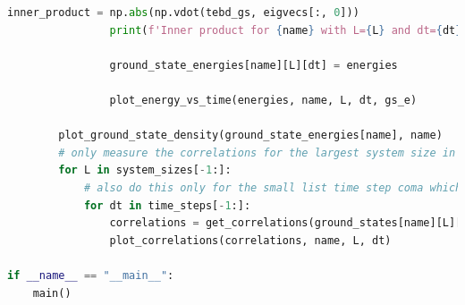 \documentclass[12pt]{article}
\begin{document}
\begin{lstlisting}[language=Python]
                inner_product = np.abs(np.vdot(tebd_gs, eigvecs[:, 0]))
                print(f'Inner product for {name} with L={L} and dt={dt} is {inner_product}')
                
                ground_state_energies[name][L][dt] = energies
                
                plot_energy_vs_time(energies, name, L, dt, gs_e)
        
        plot_ground_state_density(ground_state_energies[name], name)
        # only measure the correlations for the largest system size in the list
        for L in system_sizes[-1:]:
            # also do this only for the small list time step coma which is at the end of the list
            for dt in time_steps[-1:]:
                correlations = get_correlations(ground_states[name][L][dt])
                plot_correlations(correlations, name, L, dt)

if __name__ == "__main__":
    main()
 

    

        
    
    

        
    
    
\end{lstlisting}
\newpage
\end{document}

